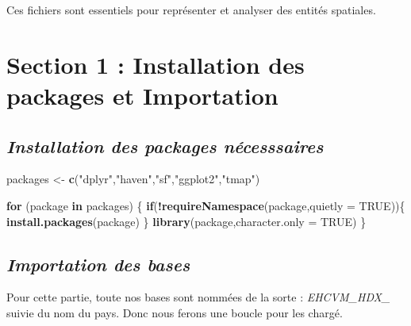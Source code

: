 \documentclass[
]{article}
\newenvironment{Shaded}{\begin{snugshade}}{\end{snugshade}}
\newcommand{\AttributeTok}[1]{\textcolor[rgb]{0.13,0.29,0.53}{#1}}
\newcommand{\ConstantTok}[1]{\textcolor[rgb]{0.56,0.35,0.01}{#1}}
\newcommand{\ControlFlowTok}[1]{\textcolor[rgb]{0.13,0.29,0.53}{\textbf{#1}}}
\newcommand{\FunctionTok}[1]{\textcolor[rgb]{0.13,0.29,0.53}{\textbf{#1}}}
\newcommand{\NormalTok}[1]{#1}
\newcommand{\OtherTok}[1]{\textcolor[rgb]{0.56,0.35,0.01}{#1}}
\newcommand{\SpecialCharTok}[1]{\textcolor[rgb]{0.81,0.36,0.00}{\textbf{#1}}}
\newcommand{\StringTok}[1]{\textcolor[rgb]{0.31,0.60,0.02}{#1}}
\begin{document}
Ces fichiers sont essentiels pour représenter et analyser des entités
spatiales.

\newpage

\section{\texorpdfstring{\textbf{Section 1 : Installation des packages
et
Importation}}{Section 1 : Installation des packages et Importation}}\label{section-1-installation-des-packages-et-importation}

\subsection{\texorpdfstring{\emph{Installation des packages
nécesssaires}}{Installation des packages nécesssaires}}\label{installation-des-packages-nuxe9cesssaires}

\begin{Shaded}
\begin{Highlighting}[]
\NormalTok{packages }\OtherTok{\textless{}{-}}  \FunctionTok{c}\NormalTok{(}\StringTok{"dplyr"}\NormalTok{,}\StringTok{"haven"}\NormalTok{,}\StringTok{"sf"}\NormalTok{,}\StringTok{"ggplot2"}\NormalTok{,}\StringTok{"tmap"}\NormalTok{)}

\ControlFlowTok{for}\NormalTok{ (package }\ControlFlowTok{in}\NormalTok{ packages) \{}
  \ControlFlowTok{if}\NormalTok{(}\SpecialCharTok{!}\FunctionTok{requireNamespace}\NormalTok{(package,}\AttributeTok{quietly =} \ConstantTok{TRUE}\NormalTok{))\{}
    \FunctionTok{install.packages}\NormalTok{(package)}
\NormalTok{  \}}
  \FunctionTok{library}\NormalTok{(package,}\AttributeTok{character.only =} \ConstantTok{TRUE}\NormalTok{)}
\NormalTok{\}}
\end{Highlighting}
\end{Shaded}

\subsection{\texorpdfstring{\emph{Importation des
bases}}{Importation des bases}}\label{importation-des-bases}

Pour cette partie, toute nos bases sont nommées de la sorte :
\emph{EHCVM\_HDX\_} suivie du nom du pays. Donc nous ferons une boucle
pour les chargé.
\end{document}
